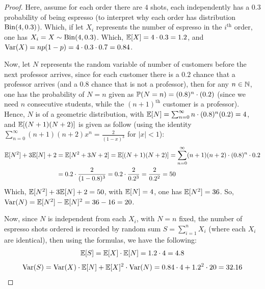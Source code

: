 \documentclass{article}
\begin{document}
\begin{proof}
    Here, assume for each order there are $4$ shots, each independently has a $0.3$ probability of being espresso (to interpret why each order has distribution $\mathrm{Bin}(4,0.3)$). Which, if let $X_i$ represents the number of espresso in the $i^\text{th}$ order, one has $X_i = X \sim \mathrm{Bin}(4,0.3)$. Which, $\mathbb{E}[X] = 4\cdot 0.3 = 1.2$, and $\mathrm{Var}(X) = np(1-p) = 4\cdot 0.3\cdot 0.7 = 0.84$.

    Now, let $N$ represents the random variable of number of customers before the next professor arrives, since for each customer there is a $0.2$ chance that a professor arrives (and a $0.8$ chance that is not a professor), then for any $n \in \mathbb{N}$, one has the probability of $N=n$ given as $\mathbb{P}(N=n) = (0.8)^n\cdot (0.2)$ (since we need $n$ consecutive students, while the $(n+1)^\text{th}$ customer is a professor). Hence, $N$ is of a geometric distribution, with $\mathbb{E}[N] = \sum_{n=0}^{\infty}n\cdot (0.8)^n(0.2) = 4$, and $\mathbb{E}[(N+1)(N+2)]$ is given as follow (using the identity $\sum_{n=0}^\infty (n+1)(n+2)x^n = \frac{2}{(1-x)^3}$ for $|x|<1$):
    \begin{align}
        \mathbb{E}[N^2]+3\mathbb{E}[N]+2 &= \mathbb{E}[N^2+3N+2]=\mathbb{E}[(N+1)(N+2)] = \sum_{n=0}^{\infty}(n+1)(n+2)\cdot (0.8)^n\cdot 0.2\\
        &= 0.2\cdot \frac{2}{(1-0.8)^3} = 0.2\cdot \frac{2}{0.2^3} = \frac{2}{0.2^2} = 50
    \end{align}
    Which, $\mathbb{E}[N^2]+3\mathbb{E}[N]+2 = 50$, with $\mathbb{E}[N] = 4$, one has $\mathbb{E}[N^2] = 36$. So, $\mathrm{Var}(N) = \mathbb{E}[N^2]-\mathbb{E}[N]^2 = 36-16=20$.

    \hfil

    Now, since $N$ is independent from each $X_i$, with $N=n$ fixed, the number of espresso shots ordered is recorded by random sum $S=\sum_{i=1}^n X_i$ (where each $X_i$ are identical), then using the formulas, we have the following:
    \begin{align}
        \mathbb{E}[S] = \mathbb{E}[X]\cdot \mathbb{E}[N] = 1.2\cdot 4 = 4.8
    \end{align}
    \begin{align}
        \mathrm{Var}(S) = \mathrm{Var}(X)\cdot \mathbb{E}[N]+\mathbb{E}[X]^2\cdot \mathrm{Var}(N) = 0.84\cdot 4+1.2^2\cdot 20 = 32.16
    \end{align}
\end{proof}
\end{document}
